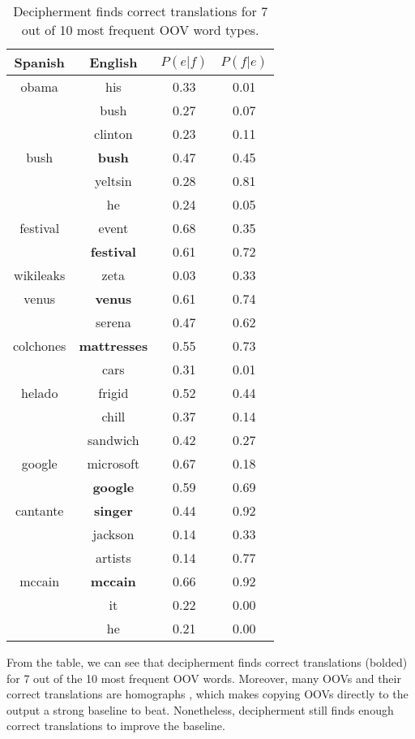  \begin{table}
 \begin{center}
 \begin{tabular}{ |c|ccc|} \hline
Spanish & English & $P(e|f)$ & $P(f|e)$ \\ \hline
obama & his & 0.33 & 0.01 \\
           & bush & 0.27 & 0.07\\
           & clinton & 0.23 & 0.11 \\ \hline
bush & \textbf{bush} & 0.47 & 0.45 \\
        & yeltsin & 0.28 & 0.81 \\
        & he & 0.24 & 0.05 \\ \hline
festival & event & 0.68 & 0.35 \\
            &\textbf{festival} & 0.61 & 0.72 \\ \hline
wikileaks & zeta & 0.03 & 0.33 \\ \hline
venus & \textbf{venus} & 0.61 & 0.74 \\
          & serena & 0.47 & 0.62 \\ \hline
colchones & \textbf{mattresses} & 0.55 & 0.73 \\
                 & cars & 0.31 & 0.01 \\ \hline
helado & frigid & 0.52 & 0.44 \\
         & chill & 0.37 & 0.14 \\
           & sandwich & 0.42 & 0.27 \\ \hline
google & microsoft & 0.67 & 0.18 \\
            & \textbf{google} & 0.59 & 0.69 \\ \hline
cantante & \textbf{singer} & 0.44 & 0.92 \\
              & jackson & 0.14 & 0.33 \\
            & artists & 0.14 & 0.77 \\ \hline
mccain & \textbf{mccain} & 0.66 & 0.92 \\
            & it & 0.22 & 0.00 \\
            & he & 0.21 & 0.00 \\\hline
 \end{tabular}

 \caption{Decipherment finds correct translations for 7 out of 10 most frequent OOV word types.}
 \label{oov_translation}
 \end{center}
 \end{table}

From the table, we can see that decipherment finds correct translations (bolded) for 7 out of the 10 most frequent OOV words. Moreover, many OOVs and their correct translations are homographs , which makes copying OOVs directly to the output a strong baseline to beat. Nonetheless, decipherment still finds enough correct translations to improve the baseline.